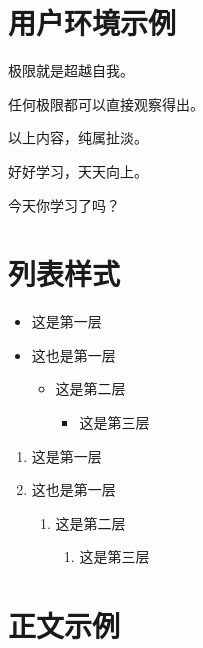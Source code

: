 \documentclass[
    10pt,
    oneside,
    openany,
    b5paper,
    colorscheme = black  %
]{qyxf-book}
\begin{document}
\section{用户环境示例}

\begin{define}
    极限就是超越自我。
\end{define}

\begin{theorem}
    任何极限都可以直接观察得出。
\end{theorem}

\begin{lemma}
    以上内容，纯属扯淡。
\end{lemma}

\begin{note}
好好学习，天天向上。
\end{note}

\begin{alert}
今天你学习了吗？
\end{alert}

\section{列表样式}
\begin{itemize}
    \item 这是第一层
    \item 这也是第一层
    \begin{itemize}
        \item 这是第二层
        \begin{itemize}
            \item 这是第三层
        \end{itemize}
    \end{itemize}
\end{itemize}

\begin{enumerate}
    \item 这是第一层
    \item 这也是第一层
    \begin{enumerate}
        \item 这是第二层
        \begin{enumerate}
            \item 这是第三层
        \end{enumerate}
    \end{enumerate}
\end{enumerate}

\section{正文示例}
\end{document}
